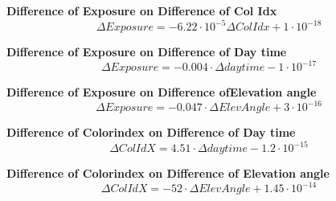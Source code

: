 \documentclass  [
  paper    = a4,
  BCOR     = 10mm,
  twoside,
  fontsize = 12pt,
  fleqn,
  toc      = bibnumbered,
  toc      = listofnumbered,
  numbers  = noendperiod,
  headings = normal,
  listof   = leveldown,
  version  = 3.03
]                                       {scrreprt}
\begin{document}
		\textbf{Difference of Exposure on  Difference of  Col Idx}
		\begin{equation}
		\Delta Exposure  =-6.22\cdot 10^{-5} \Delta Col Idx  +1\cdot 10^{-18}
		\end{equation}
		
		\textbf{Difference of  Exposure on  Difference of Day time}
		\begin{equation}
		\Delta Exposure  =-0.004\cdot \Delta daytime -1\cdot 10^{-17}
		\end{equation}
		
		\textbf{Difference of  Exposure  on  Difference ofElevation angle}
		\begin{equation}
		\Delta Exposure  =-0.047\cdot \Delta  ElevAngle +3\cdot 10^{-16}
		\end{equation}


		\textbf{Difference of  Colorindex  on  Difference of Day time}
		\begin{equation}
		\Delta ColIdX  =4.51\cdot \Delta daytime-1.2\cdot 10^{-15}
		\end{equation}
		
		\textbf{Difference of  Colorindex  on  Difference of Elevation angle}
		\begin{equation}
		\Delta ColIdX  =-52\cdot \Delta ElevAngle+ 1.45\cdot 10^{-14}
		\end{equation}
		
\end{document}
